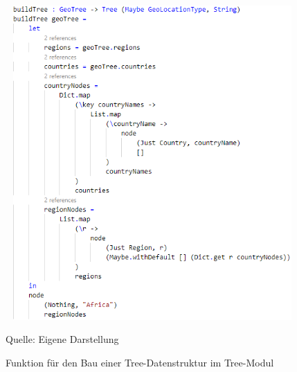 \documentclass[usegeometry=true]{scrartcl}
\begin{document}
\begin{figure}[]
\begin{center}
\includegraphics[width=12cm,height=12cm,keepaspectratio]{buildTree.PNG}%
\caption{Funktion für den Bau einer Tree-Datenstruktur im Tree-Modul}
Quelle: Eigene Darstellung
\label{buildTree}
\end{center}
\end{figure}
\end{document}
